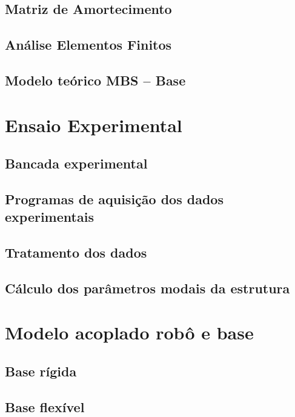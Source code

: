 \subsection{Matriz de Amortecimento}

\subsection{Análise Elementos Finitos}

\subsection{Modelo teórico MBS -- Base}


\section{Ensaio Experimental}

\subsection{Bancada experimental}

\subsection{Programas de aquisição dos dados experimentais}

\subsection{Tratamento dos dados}

\subsection{Cálculo dos parâmetros modais da estrutura}


\section{Modelo acoplado robô e base}

\subsection{Base rígida}

\subsection{Base flexível}



